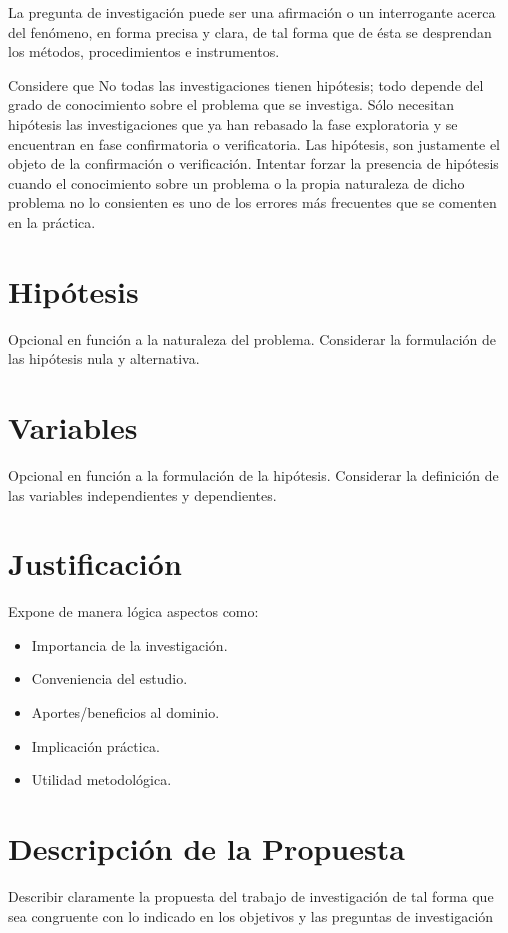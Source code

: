 \documentclass[12]{plan_tesis}
\begin{document}
La pregunta de investigación puede ser una afirmación o un interrogante acerca del fenómeno, en forma precisa y clara, de tal forma que de ésta se desprendan los métodos, procedimientos e instrumentos.\newline

Considere que No todas las investigaciones tienen hipótesis; todo depende del grado de conocimiento sobre el problema que se investiga. Sólo necesitan hipótesis las investigaciones que ya han rebasado la fase exploratoria y se encuentran en fase confirmatoria o verificatoria. Las hipótesis, son justamente el objeto de la confirmación o verificación. Intentar forzar la presencia de hipótesis cuando el conocimiento sobre un problema o la propia naturaleza de dicho problema no lo consienten es uno de los errores más frecuentes que se comenten en la práctica.

\section{Hipótesis}
Opcional en función a la naturaleza del problema. Considerar la formulación de las hipótesis nula y alternativa.

\section{Variables}
Opcional en función a la formulación de la hipótesis. Considerar la definición de las variables independientes y dependientes.

\section{Justificación}
Expone de manera lógica aspectos como:

\begin{itemize}
    \item Importancia de la investigación.
    \item Conveniencia del estudio.
    \item Aportes/beneficios al dominio.
    \item Implicación práctica.
    \item Utilidad metodológica.
\end{itemize}

\section{Descripción de la Propuesta}
Describir claramente la propuesta del trabajo de investigación de tal forma que sea congruente con lo indicado en los objetivos y las preguntas de investigación
\end{document}
